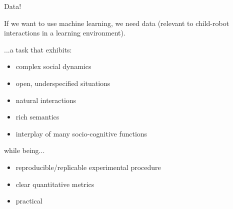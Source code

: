 \documentclass[compress]{beamer}
\begin{document}
\begin{frame}{Data!}

    If we want to use machine learning, we need data (relevant to child-robot
    interactions in a learning environment).
    
    \pause

    ...a task that exhibits:

    \begin{itemize}
        \item complex social dynamics
        \item open, underspecified situations
        \item natural interactions
        \item rich semantics
        \item interplay of many socio-cognitive functions
    \end{itemize}

    \pause

    while being...
    \begin{itemize}
        \item reproducible/replicable experimental procedure
        \item clear quantitative metrics
        \item practical
    \end{itemize}
\end{frame}
\end{document}
